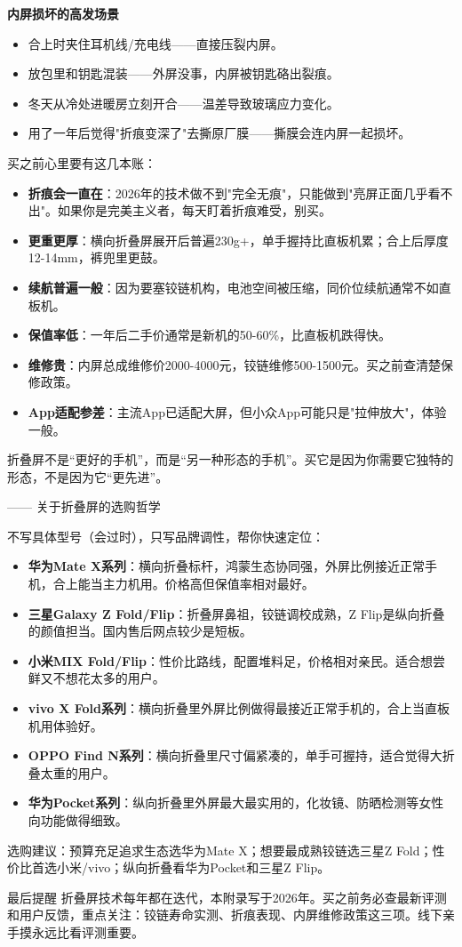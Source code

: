 \textbf{内屏损坏的高发场景}\par

\begin{itemize}
  \item 合上时夹住耳机线/充电线——直接压裂内屏。
  \item 放包里和钥匙混装——外屏没事，内屏被钥匙硌出裂痕。
  \item 冬天从冷处进暖房立刻开合——温差导致玻璃应力变化。
  \item 用了一年后觉得"折痕变深了"去撕原厂膜——撕膜会连内屏一起损坏。
\end{itemize}


买之前心里要有这几本账：

\begin{itemize}
  \item \textbf{折痕会一直在}：2026年的技术做不到"完全无痕"，只能做到"亮屏正面几乎看不出"。如果你是完美主义者，每天盯着折痕难受，别买。
  \item \textbf{更重更厚}：横向折叠屏展开后普遍230g+，单手握持比直板机累；合上后厚度12-14mm，裤兜里更鼓。
  \item \textbf{续航普遍一般}：因为要塞铰链机构，电池空间被压缩，同价位续航通常不如直板机。
  \item \textbf{保值率低}：一年后二手价通常是新机的50-60\%，比直板机跌得快。
  \item \textbf{维修贵}：内屏总成维修价2000-4000元，铰链维修500-1500元。买之前查清楚保修政策。
  \item \textbf{App适配参差}：主流App已适配大屏，但小众App可能只是"拉伸放大"，体验一般。
\end{itemize}

折叠屏不是“更好的手机”，而是“另一种形态的手机”。买它是因为你需要它独特的形态，不是因为它“更先进”。

—— 关于折叠屏的选购哲学


不写具体型号（会过时），只写品牌调性，帮你快速定位：

\begin{itemize}
  \item \textbf{华为Mate X系列}：横向折叠标杆，鸿蒙生态协同强，外屏比例接近正常手机，合上能当主力机用。价格高但保值率相对最好。
  \item \textbf{三星Galaxy Z Fold/Flip}：折叠屏鼻祖，铰链调校成熟，Z Flip是纵向折叠的颜值担当。国内售后网点较少是短板。
  \item \textbf{小米MIX Fold/Flip}：性价比路线，配置堆料足，价格相对亲民。适合想尝鲜又不想花太多的用户。
  \item \textbf{vivo X Fold系列}：横向折叠里外屏比例做得最接近正常手机的，合上当直板机用体验好。
  \item \textbf{OPPO Find N系列}：横向折叠里尺寸偏紧凑的，单手可握持，适合觉得大折叠太重的用户。
  \item \textbf{华为Pocket系列}：纵向折叠里外屏最大最实用的，化妆镜、防晒检测等女性向功能做得细致。
\end{itemize}

选购建议：预算充足追求生态选华为Mate X；想要最成熟铰链选三星Z Fold；性价比首选小米/vivo；纵向折叠看华为Pocket和三星Z Flip。

\begin{tcbinfo}{最后提醒}
折叠屏技术每年都在迭代，本附录写于2026年。买之前务必查最新评测和用户反馈，重点关注：铰链寿命实测、折痕表现、内屏维修政策这三项。线下亲手摸永远比看评测重要。

\end{tcbinfo}
